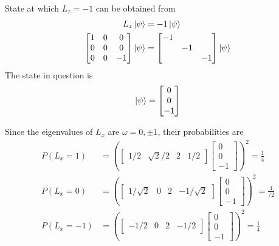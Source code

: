 \documentclass[../../../main.tex]{subfiles}
\begin{document}
State at which $L_z=-1$ can be obtained from
\begin{align*}
    L_z \ket{\psi} & =-  1 \ket{\psi} \\
    \begin{bmatrix}
        1 & 0 & 0  \\
        0 & 0 & 0  \\
        0 & 0 & -1 \\
    \end{bmatrix}
    \ket{\psi}     & =
    \begin{bmatrix}
        -1 &    &    \\
           & -1 &    \\
           &    & -1 \\
    \end{bmatrix}
    \ket{\psi}
\end{align*}
The state in question is
\begin{equation*}
    \ket{\psi}=
    \begin{bmatrix}
        0 \\0\\-1\\
    \end{bmatrix}
\end{equation*}

Since the eigenvalues of $L_x$ are $\omega=0,\pm 1$, their probabilities are
\begin{align*}
    P(L_x=1)  & = \left(
    \begin{bmatrix}
            1/2 & \sqrt{2}/2 & 2 & 1/2
        \end{bmatrix}
    \begin{bmatrix}
            0 \\0\\-1
        \end{bmatrix}
    \right) ^2=\frac{1 }{4}  \\
    P(L_x=0)  & = \left(
    \begin{bmatrix}
            1/\sqrt{2} & 0 & 2 & -1/\sqrt{2}
        \end{bmatrix}
    \begin{bmatrix}
            0 \\0\\-1
        \end{bmatrix}
    \right) ^2=\frac{1 }{/2} \\
    P(L_x=-1) & = \left(
    \begin{bmatrix}
            -1/2 & 0 & 2 & -1/2
        \end{bmatrix}
    \begin{bmatrix}
            0 \\0\\-1
        \end{bmatrix}
    \right) ^2=\frac{1 }{4}  \\
\end{align*}
\end{document}
